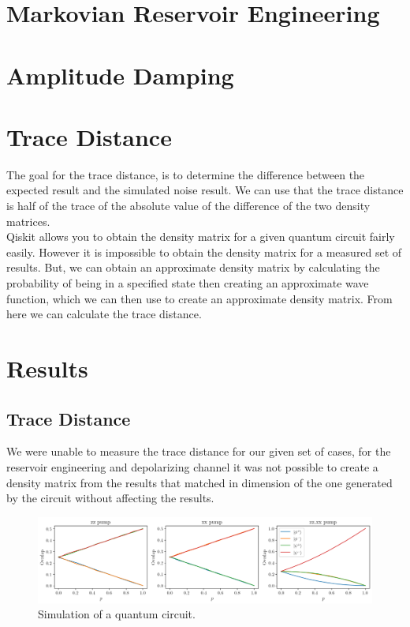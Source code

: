\documentclass[12pt]{article}
\begin{document}
  \section{Markovian Reservoir Engineering}
  \blindtext

  \section{Amplitude Damping}
  \blindtext

\section{Trace Distance}
        The goal for the trace distance, is to determine the difference between the expected result and the simulated noise result. We can use that the trace distance is half of the trace of the absolute value of the difference of the two density matrices. \\
        Qiskit allows you to obtain the density matrix for a given quantum circuit fairly easily. However it is impossible to obtain the density matrix for a measured set of results. But, we can obtain an approximate density matrix by calculating the probability of being in a specified state then creating an approximate wave function, which we can then use to create an approximate density matrix. From here we can calculate the trace distance.  

  \section{Results}
  \subsection{Trace Distance}
        We were unable to measure the trace distance for our given set of cases, for the reservoir engineering and depolarizing channel it was not possible to create a density matrix from the results that matched in dimension of the one generated by the circuit without affecting the results.

  \begin{figure}
    \centering
    \includegraphics[width=\textwidth]{images/reservoir-engineering-simulation}
    \caption{Simulation of a quantum circuit.%
      \label{fig:reservoir-engineering-simulation}}
  \end{figure}

  \printbibliography
\end{document}

